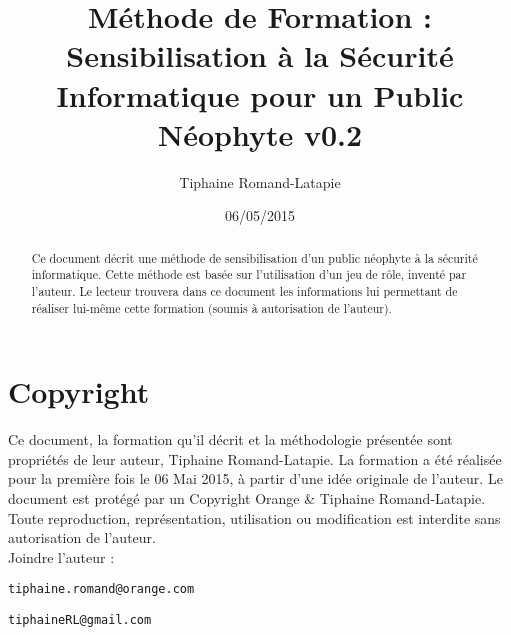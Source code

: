\documentclass[11pt]{article} %
\title{Méthode de Formation : Sensibilisation à la Sécurité Informatique pour un
Public Néophyte v0.2}
\author{Tiphaine Romand-Latapie}
\date{06/05/2015} %
\begin{document}
\maketitle

\begin{abstract}
Ce document décrit une méthode de sensibilisation d'un public néophyte à la
sécurité informatique. Cette méthode est basée sur l'utilisation d'un jeu de
rôle, inventé par l'auteur. Le lecteur trouvera dans ce document les
informations lui permettant de réaliser lui-même cette formation (soumis à
autorisation de l'auteur).
\end{abstract}

\section{Copyright}
Ce document, la formation qu'il décrit et la méthodologie présentée sont
propriétés de leur auteur, Tiphaine Romand-Latapie. La formation a été réalisée
pour la première fois le 06 Mai 2015, à partir d'une idée originale de l'auteur.
Le document est protégé par un Copyright Orange \& Tiphaine Romand-Latapie.
Toute reproduction, représentation, utilisation ou modification est interdite
sans autorisation de l'auteur.
\\
Joindre l'auteur : 
\begin{verbatim}tiphaine.romand@orange.com\end{verbatim}
\begin{verbatim}tiphaineRL@gmail.com\end{verbatim}
\end{document}

